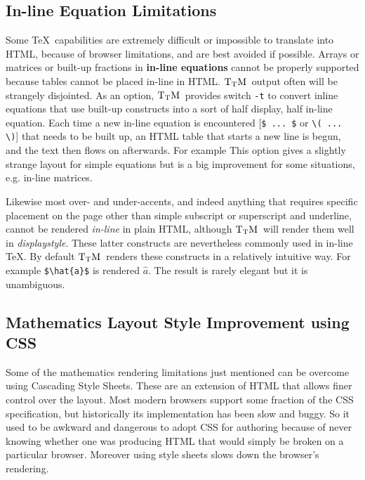 \documentclass[12pt]{article}
\def\TtM{$\rm{}T_TH$}
\def\TtM{$\rm{}T_TM$}%
\begin{document}
\subsection{In-line Equation Limitations}

 
 Some \TeX\ capabilities are
extremely difficult or impossible to translate into HTML, because of
browser limitations, and are best avoided if possible. Arrays or
matrices or built-up fractions in {\bf in-line equations} cannot be
properly supported because tables cannot be placed in-line in HTML.
\TtM\ output often will be strangely disjointed.
\label{inline}
 As an option, \TtM\ provides switch \verb+-t+ to convert inline
equations that use built-up constructs into a sort of half display,
half in-line equation. Each time a new in-line equation is encountered
[\verb+$ ... $+ or \verb+\( ... \)+] that needs to be built up, an
HTML table that starts a new line is begun, and the text then flows on
afterwards. For example
This option gives a slightly strange layout for simple equations
but is a big improvement for some situations, e.g. in-line matrices.
\fi

Likewise most over- and under-accents, and indeed anything that
requires specific placement on the page other than simple subscript or
superscript and underline, cannot be rendered \emph{in-line} in plain
HTML, although \TtM\ will render them well in
\emph{displaystyle}. These latter constructs are nevertheless commonly
used in in-line \TeX. By default \TtM\ renders these constructs in a
relatively intuitive way. For example \verb|$\hat{a}$| is rendered
$\hat{a}$. The result is rarely elegant but it is
unambiguous. 

\subsection{Mathematics Layout Style Improvement using CSS}\label{yswitch}

Some of the mathematics rendering limitations just mentioned can be
 overcome using Cascading Style Sheets. These are an extension of HTML
 that allows finer control over the layout. Most modern browsers
 support some fraction of the CSS specification, but historically its
 implementation has been slow and buggy. So it used to be awkward and
 dangerous to adopt CSS for authoring because of never knowing whether
 one was producing HTML that would simply be broken on a particular
 browser. Moreover using style sheets slows down the browser's
 rendering.
\end{document}
